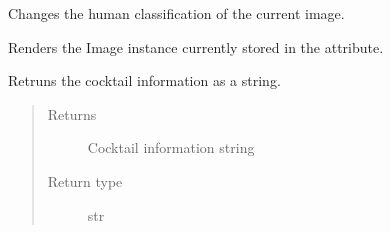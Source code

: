 \documentclass[letterpaper,10pt,english]{sphinxmanual}
\begin{document}
\begin{fulllineitems}
\begin{fulllineitems}
\end{fulllineitems}


\begin{fulllineitems}
\label{\detokenize{polo.widgets:polo.widgets.slideshow_viewer.SlideshowViewer.classify_current_image}}
Changes the human classification of the current image.

\end{fulllineitems}


\begin{fulllineitems}
\label{\detokenize{polo.widgets:polo.widgets.slideshow_viewer.SlideshowViewer.display_current_image}}
Renders the Image instance currently stored in the 
attribute.

\end{fulllineitems}


\begin{fulllineitems}
\label{\detokenize{polo.widgets:polo.widgets.slideshow_viewer.SlideshowViewer.get_cur_img_cocktail_str}}
Retruns the  cocktail information
as a string.
\begin{quote}\begin{description}
\item[{Returns}] \leavevmode
Cocktail information string

\item[{Return type}] \leavevmode
str

\end{description}\end{quote}


\end{fulllineitems}
\end{fulllineitems}
\end{document}
